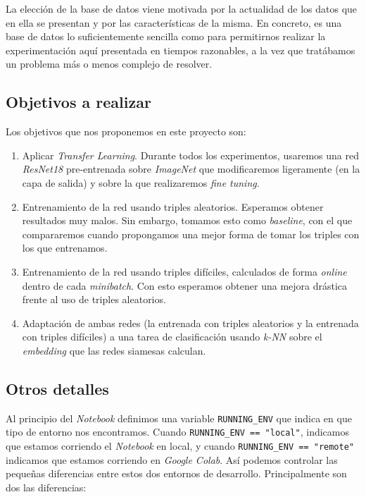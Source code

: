 \documentclass[11pt]{article}
\begin{document}
La elección de la base de datos viene motivada por la actualidad de los datos que en ella se presentan y por las características de la misma. En concreto, es una base de datos lo suficientemente sencilla como para permitirnos realizar la experimentación aquí presentada en tiempos razonables, a la vez que tratábamos un problema más o menos complejo de resolver.

\subsection{Objetivos a realizar}

Los objetivos que nos proponemos en este proyecto son:

\begin{enumerate}
  \item Aplicar \emph{Transfer Learning}. Durante todos los experimentos, usaremos una red \emph{ResNet18} pre-entrenada sobre \emph{ImageNet} que modificaremos ligeramente (en la capa de salida) y sobre la que realizaremos \emph{fine tuning}.
  \item Entrenamiento de la red usando triples aleatorios. Esperamos obtener resultados muy malos. Sin embargo, tomamos esto como \emph{baseline}, con el que compararemos cuando propongamos una mejor forma de tomar los triples con los que entrenamos.
  \item Entrenamiento de la red usando triples difíciles, calculados de forma \emph{online} dentro de cada \emph{minibatch}. Con esto esperamos obtener una mejora drástica frente al uso de triples aleatorios.
  \item Adaptación de ambas redes (la entrenada con triples aleatorios y la entrenada con triples difíciles) a una tarea de clasificación usando \emph{k-NN} sobre el \emph{embedding} que las redes siamesas calculan.
\end{enumerate}

\subsection{Otros detalles}

Al principio del \emph{Notebook} definimos una variable \lstinline{RUNNING_ENV} que indica en que tipo de entorno nos encontramos. Cuando \lstinline{RUNNING_ENV == "local"}, indicamos que estamos corriendo el \emph{Notebook} en local, y cuando \lstinline{RUNNING_ENV == "remote"} indicamos que estamos corriendo en \emph{Google Colab}. Así podemos controlar las pequeñas diferencias entre estos dos entornos de desarrollo. Principalmente son dos las diferencias:
\end{document}
